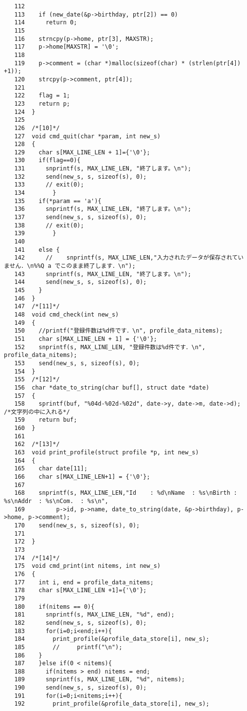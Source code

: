 \documentclass[a4j]{jarticle}
\begin{document}
\begin{verbatim}
   112	
   113	  if (new_date(&p->birthday, ptr[2]) == 0)
   114	    return 0;
   115	
   116	  strncpy(p->home, ptr[3], MAXSTR);
   117	  p->home[MAXSTR] = '\0';
   118	
   119	  p->comment = (char *)malloc(sizeof(char) * (strlen(ptr[4]) +1));
   120	  strcpy(p->comment, ptr[4]);
   121	
   122	  flag = 1;
   123	  return p;
   124	}
   125	
   126	/*[10]*/
   127	void cmd_quit(char *param, int new_s)
   128	{
   129	  char s[MAX_LINE_LEN + 1]={'\0'};
   130	  if(flag==0){
   131	    snprintf(s, MAX_LINE_LEN, "終了します。\n");
   132	    send(new_s, s, sizeof(s), 0);
   133	    // exit(0);
   134	      }
   135	  if(*param == 'a'){
   136	    snprintf(s, MAX_LINE_LEN, "終了します。\n");
   137	    send(new_s, s, sizeof(s), 0);
   138	    // exit(0);
   139	      }
   140	
   141	  else {
   142	    //    snprintf(s, MAX_LINE_LEN,"入力されたデータが保存されていません．\n%%Q a でこのまま終了します．\n");
   143	    snprintf(s, MAX_LINE_LEN, "終了します。\n");
   144	    send(new_s, s, sizeof(s), 0);
   145	  }
   146	}
   147	/*[11]*/
   148	void cmd_check(int new_s)
   149	{
   150	  //printf("登録件数は%d件です．\n", profile_data_nitems);
   151	  char s[MAX_LINE_LEN + 1] = {'\0'};
   152	  snprintf(s, MAX_LINE_LEN, "登録件数は%d件です．\n", profile_data_nitems);
   153	  send(new_s, s, sizeof(s), 0);
   154	}
   155	/*[12]*/
   156	char *date_to_string(char buf[], struct date *date)
   157	{
   158	  sprintf(buf, "%04d-%02d-%02d", date->y, date->m, date->d); /*文字列の中に入れる*/
   159	  return buf;
   160	}
   161	
   162	/*[13]*/
   163	void print_profile(struct profile *p, int new_s)
   164	{
   165	  char date[11];
   166	  char s[MAX_LINE_LEN+1] = {'\0'};
   167	
   168	  snprintf(s, MAX_LINE_LEN,"Id    : %d\nName  : %s\nBirth : %s\nAddr  : %s\nCom.  : %s\n", 
   169		   p->id, p->name, date_to_string(date, &p->birthday), p->home, p->comment);
   170	  send(new_s, s, sizeof(s), 0);
   171	
   172	}
   173	
   174	/*[14]*/
   175	void cmd_print(int nitems, int new_s)
   176	{
   177	  int i, end = profile_data_nitems;
   178	  char s[MAX_LINE_LEN +1]={'\0'};
   179	
   180	  if(nitems == 0){
   181	    snprintf(s, MAX_LINE_LEN, "%d", end);
   182	    send(new_s, s, sizeof(s), 0);
   183	    for(i=0;i<end;i++){
   184	      print_profile(&profile_data_store[i], new_s);
   185	      //     printf("\n");
   186	  }
   187	  }else if(0 < nitems){
   188	    if(nitems > end) nitems = end;
   189	    snprintf(s, MAX_LINE_LEN, "%d", nitems);
   190	    send(new_s, s, sizeof(s), 0);
   191	    for(i=0;i<nitems;i++){
   192	      print_profile(&profile_data_store[i], new_s);

\end{verbatim}
\end{document}
